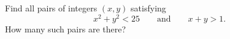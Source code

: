 Find all pairs of integers $(x,y)$ satisfying
\[x^2+y^2<25\qquad\text{and}\qquad x+y>1.\]
How many such pairs are there?
